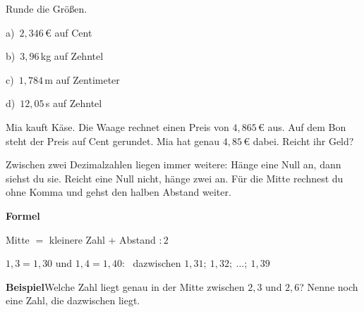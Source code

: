 \documentclass[11pt]{article}
\makeatletter
\newcommand{\aufg}[3]{\par\noindent\makebox[0pt][r]{#3}\begin{minipage}[t]{\linewidth}#1\end{minipage}\par}
\newcommand{\nr}[1]{\makebox[7mm][l]{\textbf{#1}}}
\newlength{\kr}
\newcommand{\karomerk}[2]{\protected@write\@auxout{}{\string\karoseite{#1}{#2}{\thepage}}}
\newcommand{\karoseite}[3]{\expandafter\xdef\csname karo@#1@#2\endcsname{#3}}
\makeatother
\begin{document}
\medskip
\aufg{\nr{4.}Runde die Größen.\par\vspace{3pt} a)~$2{,}346$\,€ auf Cent \par b)~$3{,}96$\,kg auf Zehntel \par c)~$1{,}784$\,m auf Zentimeter \par d)~$12{,}05$\,s auf Zehntel}{}{}
\medskip
\aufg{\nr{5.}Mia kauft Käse. Die Waage rechnet einen Preis von $4{,}865$\,€ aus. Auf dem Bon steht der Preis auf Cent gerundet. Mia hat genau $4{,}85$\,€ dabei. Reicht ihr Geld?}{}{{\scriptsize\color{mbgrau}Ziel\hspace{2mm}}}
\medskip
\par\vspace{3mm}\setlength{\kr}{\dimexpr\pagegoal-\pagetotal-10mm\relax}%
\ifdim\kr>12mm\karomerk{k}{B}\noindent{\scriptsize\color{mbgrau}Platz zum Rechnen}\par\nointerlineskip\vspace{1mm}\noindent
\begin{tikzpicture}\clip (0,0) rectangle ({\linewidth-0.5mm},\kr);\draw[black!16,line width=0.3pt,step=5mm] (0,0) grid (\linewidth,\kr);\end{tikzpicture}\fi\par
\clearpage\label{s:C}\noindent\colorbox{black!12}{}\hspace{3mm}{\Large\bfseries Dazwischen und genau in der Mitte}\par\smallskip
\noindent Zwischen zwei Dezimalzahlen liegen immer weitere: Hänge eine Null an, dann siehst du sie. Reicht eine Null nicht, hänge zwei an. Für die Mitte rechnest du ohne Komma und gehst den halben Abstand weiter.\par\medskip
\noindent\textbf{Formel}\par\nopagebreak\noindent\hspace*{4mm}\begin{minipage}{\dimexpr\linewidth-4mm\relax}Mitte $=$ kleinere Zahl $+$ Abstand $: 2$ \par\vspace{4pt} $1{,}3 = 1{,}30$ und $1{,}4 = 1{,}40$: \ dazwischen $1{,}31;\ 1{,}32;\ \ldots;\ 1{,}39$\end{minipage}\par\medskip
\noindent\textbf{Beispiel}\quad Welche Zahl liegt genau in der Mitte zwischen $2{,}3$ und $2{,}6$? Nenne noch eine Zahl, die dazwischen liegt.\par\smallskip
\end{document}
